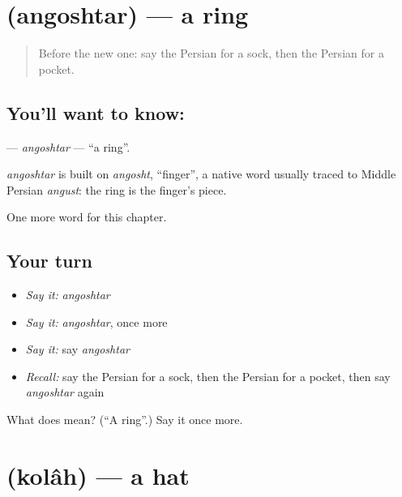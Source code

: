 \section[\texorpdfstring{\fa{انگشتر} (angoshtar)}{انگشتر (angoshtar)}]{ (angoshtar) — a ring}

\label{lesson:FA-C74-angoshtar}



\begin{quote}
Before the new one: say the Persian for a sock, then the Persian for a pocket.
\end{quote}

\subsection*{You'll want to know: }
\textbf{} — \emph{angoshtar} — \textquotedblleft{}a ring\textquotedblright{}.

\begin{cousinweb}
\emph{angoshtar} is built on \emph{angosht}, \textquotedblleft{}finger\textquotedblright{}, a native word usually traced to Middle Persian \emph{angust}: the ring is the finger's piece.
\end{cousinweb}

\begin{grammarlens}[title={What you've built}]
One more word for this chapter.
\end{grammarlens}

\subsection*{Your turn}
\begin{itemize}
\raggedright
  \item \emph{Say it:} \emph{angoshtar}
  \item \emph{Say it:} \emph{angoshtar}, once more
  \item \emph{Say it:} say \emph{angoshtar}
  \item \emph{Recall:} say the Persian for a sock, then the Persian for a pocket, then say \emph{angoshtar} again
\end{itemize}

\begin{tcolorbox}[breakable,colback=teal!4,colframe=teal!35!black,title={Before you move on}]
What does  mean? (\textquotedblleft{}A ring\textquotedblright{}.) Say it once more.
\end{tcolorbox}
\section[\texorpdfstring{\fa{کلاه} (kolâh)}{کلاه (kolâh)}]{ (kolâh) — a hat}


